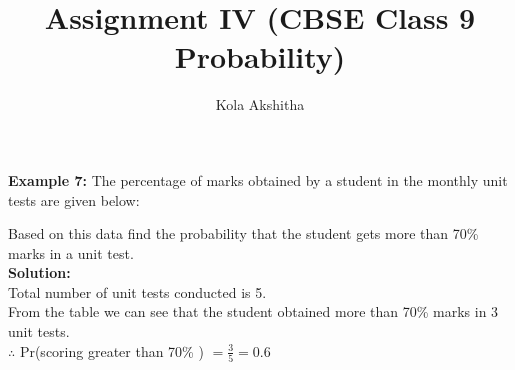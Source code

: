 \documentclass[journal,12pt,onecolumn]{IEEEtran}
\newcommand{\solution}{\noindent \textbf{Solution: }}
\begin{document}
\vspace{3cm}
\title{Assignment IV (CBSE Class 9 Probability)}
\author{Kola Akshitha}
\maketitle
\textbf{Example 7:} The percentage of marks obtained by a student in the monthly unit tests are given below: \\
\begin{table}[ht!]
\begin{center}
    
	\vspace{5pt}
\caption{}
\label{table:table1}
\end{center}
	
\end{table}
Based on this data find the probability that the student gets more than 70\% marks in a unit test. \\
\solution\\
Total number of unit tests conducted is 5.\\
From the table we can see that the student obtained more than 70\% marks in 3 unit tests. \\
$\therefore$ 
   Pr(scoring greater than 70\% ) $= \frac{3}{5} = 0.6$
\end{document}
